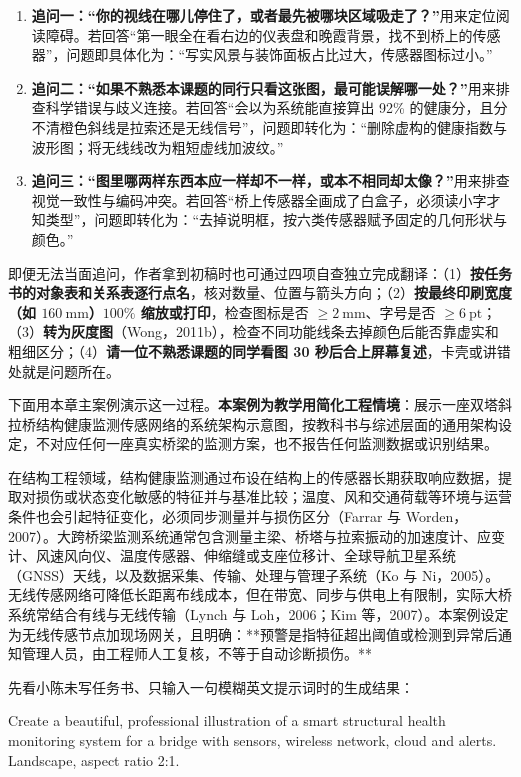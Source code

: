 \begin{enumerate}
\item \textbf{追问一：“你的视线在哪儿停住了，或者最先被哪块区域吸走了？”}用来定位阅读障碍。若回答“第一眼全在看右边的仪表盘和晚霞背景，找不到桥上的传感器”，问题即具体化为：“写实风景与装饰面板占比过大，传感器图标过小。”
\item \textbf{追问二：“如果不熟悉本课题的同行只看这张图，最可能误解哪一处？”}用来排查科学错误与歧义连接。若回答“会以为系统能直接算出 92\% 的健康分，且分不清橙色斜线是拉索还是无线信号”，问题即转化为：“删除虚构的健康指数与波形图；将无线线改为粗短虚线加波纹。”
\item \textbf{追问三：“图里哪两样东西本应一样却不一样，或本不相同却太像？”}用来排查视觉一致性与编码冲突。若回答“桥上传感器全画成了白盒子，必须读小字才知类型”，问题即转化为：“去掉说明框，按六类传感器赋予固定的几何形状与颜色。”
\end{enumerate}

即便无法当面追问，作者拿到初稿时也可通过四项自查独立完成翻译：（1）\textbf{按任务书的对象表和关系表逐行点名}，核对数量、位置与箭头方向；（2）\textbf{按最终印刷宽度（如 $160\ \text{mm}$）$100\%$ 缩放或打印}，检查图标是否 $\ge 2\ \text{mm}$、字号是否 $\ge 6\ \text{pt}$；（3）\textbf{转为灰度图}（Wong，2011b），检查不同功能线条去掉颜色后能否靠虚实和粗细区分；（4）\textbf{请一位不熟悉课题的同学看图 30 秒后合上屏幕复述}，卡壳或讲错处就是问题所在。

下面用本章主案例演示这一过程。\textbf{本案例为教学用简化工程情境}：展示一座双塔斜拉桥结构健康监测传感网络的系统架构示意图，按教科书与综述层面的通用架构设定，不对应任何一座真实桥梁的监测方案，也不报告任何监测数据或识别结果。

在结构工程领域，结构健康监测通过布设在结构上的传感器长期获取响应数据，提取对损伤或状态变化敏感的特征并与基准比较；温度、风和交通荷载等环境与运营条件也会引起特征变化，必须同步测量并与损伤区分（Farrar 与 Worden，2007）。大跨桥梁监测系统通常包含测量主梁、桥塔与拉索振动的加速度计、应变计、风速风向仪、温度传感器、伸缩缝或支座位移计、全球导航卫星系统（GNSS）天线，以及数据采集、传输、处理与管理子系统（Ko 与 Ni，2005）。无线传感网络可降低长距离布线成本，但在带宽、同步与供电上有限制，实际大桥系统常结合有线与无线传输（Lynch 与 Loh，2006；Kim 等，2007）。本案例设定为无线传感节点加现场网关，且明确：**预警是指特征超出阈值或检测到异常后通知管理人员，由工程师人工复核，不等于自动诊断损伤。**

先看小陈未写任务书、只输入一句模糊英文提示词时的生成结果：

\begin{Prompt}
Create a beautiful, professional illustration of a smart structural health
monitoring system for a bridge with sensors, wireless network, cloud and alerts.
Landscape, aspect ratio 2:1.
\end{Prompt}

